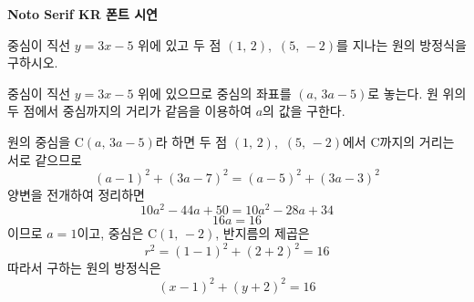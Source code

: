 \documentclass[10pt]{article}
\begin{document}
\begin{center}\bfseries\fontsize{14}{16}\selectfont [샘플] Noto Serif KR 폰트 시연\end{center}
\vspace{5mm}


\begin{dmproblem}
중심이 직선 $y = 3x - 5$ 위에 있고 두 점 $(1,\, 2)$,\ $(5,\, -2)$를 지나는 원의 방정식을 구하시오.
\end{dmproblem}

\begin{dmapproach}
중심이 직선 $y = 3x - 5$ 위에 있으므로 중심의 좌표를 $(a,\, 3a - 5)$로 놓는다. 원 위의 두 점에서 중심까지의 거리가 같음을 이용하여 $a$의 값을 구한다.
\end{dmapproach}

\begin{dmsolution}
원의 중심을 $\mathrm{C}(a,\, 3a - 5)$라 하면 두 점 $(1,\, 2)$,\ $(5,\, -2)$에서 $\mathrm{C}$까지의 거리는 서로 같으므로
\begin{equation*}
  (a - 1)^2 + (3a - 7)^2 = (a - 5)^2 + (3a - 3)^2
\end{equation*}
양변을 전개하여 정리하면
\begin{equation*}
  10a^2 - 44a + 50 = 10a^2 - 28a + 34
\end{equation*}
\begin{equation*}
  16a = 16
\end{equation*}
이므로 $a = 1$이고, 중심은 $\mathrm{C}(1,\, -2)$, 반지름의 제곱은
\begin{equation*}
  r^2 = (1 - 1)^2 + (2 + 2)^2 = 16
\end{equation*}
따라서 구하는 원의 방정식은
\begin{equation*}
  (x - 1)^2 + (y + 2)^2 = 16
\end{equation*}
\end{dmsolution}
\end{document}
